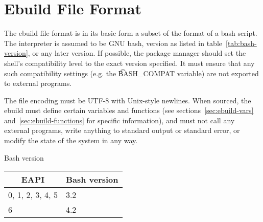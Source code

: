 \chapter{Ebuild File Format}
\label{sec:ebuild-format}

 The ebuild file format is in its basic form a subset of the format of
a bash script. The interpreter is assumed to be GNU bash, version as listed in
table~\ref{tab:bash-version}, or any later version. If possible, the package manager should set
the shell's compatibility level to the exact version specified. It must ensure that any such
compatibility settings (e.g. the \t{BASH_COMPAT} variable) are not exported to external programs.

The file encoding must be UTF-8 with Unix-style newlines. When sourced, the ebuild must define
certain variables and functions (see sections~\ref{sec:ebuild-vars} and~\ref{sec:ebuild-functions}
for specific information), and must not call any external programs, write anything to standard
output or standard error, or modify the state of the system in any way.

\begin{centertable}{Bash version}
    \label{tab:bash-version}
    \begin{tabular}{ll}
      \toprule
      \multicolumn{1}{c}{\textbf{EAPI}} &
      \multicolumn{1}{c}{\textbf{Bash version}} \\
      \midrule
      0, 1, 2, 3, 4, 5  & 3.2 \\
      6                 & 4.2 \\
      \bottomrule
    \end{tabular}
\end{centertable}


